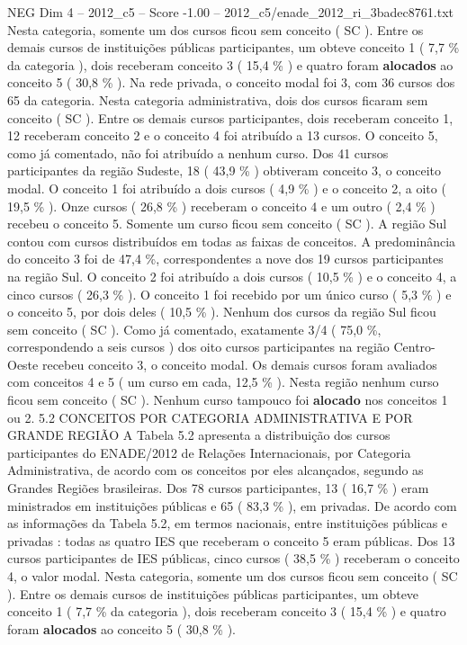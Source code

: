 \begin{textsample}{NEG Dim 4 – 2012\_c5 – Score -1.00 – 2012\_c5/enade\_2012\_ri\_3badec8761.txt}
Nesta categoria, somente um dos cursos ficou sem conceito ( SC ).
Entre os demais cursos de instituições públicas participantes, um obteve conceito 1 ( 7,7 \% da categoria ), dois receberam conceito 3 ( 15,4 \% ) e quatro foram \textbf{alocados} ao conceito 5 ( 30,8 \% ).
Na rede privada, o conceito modal foi 3, com 36 cursos dos 65 da categoria.
Nesta categoria administrativa, dois dos cursos ficaram sem conceito ( SC ).
Entre os demais cursos participantes, dois receberam conceito 1, 12 receberam conceito 2 e o conceito 4 foi atribuído a 13 cursos.
O conceito 5, como já comentado, não foi atribuído a nenhum curso.
Dos 41 cursos participantes da região Sudeste, 18 ( 43,9 \% ) obtiveram conceito 3, o conceito modal.
O conceito 1 foi atribuído a dois cursos ( 4,9 \% ) e o conceito 2, a oito ( 19,5 \% ).
Onze cursos ( 26,8 \% ) receberam o conceito 4 e um outro ( 2,4 \% ) recebeu o conceito 5.
Somente um curso ficou sem conceito ( SC ).
A região Sul contou com cursos distribuídos em todas as faixas de conceitos.
A predominância do conceito 3 foi de 47,4 \%, correspondentes a nove dos 19 cursos participantes na região Sul.
O conceito 2 foi atribuído a dois cursos ( 10,5 \% ) e o conceito 4, a cinco cursos ( 26,3 \% ).
O conceito 1 foi recebido por um único curso ( 5,3 \% ) e o conceito 5, por dois deles ( 10,5 \% ).
Nenhum dos cursos da região Sul ficou sem conceito ( SC ).
Como já comentado, exatamente 3/4 ( 75,0 \%, correspondendo a seis cursos ) dos oito cursos participantes na região Centro-Oeste recebeu conceito 3, o conceito modal.
Os demais cursos foram avaliados com conceitos 4 e 5 ( um curso em cada, 12,5 \% ).
Nesta região nenhum curso ficou sem conceito ( SC ).
Nenhum curso tampouco foi \textbf{alocado} nos conceitos 1 ou 2. 5.2 CONCEITOS POR CATEGORIA ADMINISTRATIVA E POR GRANDE REGIÃO A Tabela 5.2 apresenta a distribuição dos cursos participantes do ENADE/2012 de Relações Internacionais, por Categoria Administrativa, de acordo com os conceitos por eles alcançados, segundo as Grandes Regiões brasileiras.
Dos 78 cursos participantes, 13 ( 16,7 \% ) eram ministrados em instituições públicas e 65 ( 83,3 \% ), em privadas.
De acordo com as informações da Tabela 5.2, em termos nacionais, entre instituições públicas e privadas : todas as quatro IES que receberam o conceito 5 eram públicas.
Dos 13 cursos participantes de IES públicas, cinco cursos ( 38,5 \% ) receberam o conceito 4, o valor modal.
Nesta categoria, somente um dos cursos ficou sem conceito ( SC ).
Entre os demais cursos de instituições públicas participantes, um obteve conceito 1 ( 7,7 \% da categoria ), dois receberam conceito 3 ( 15,4 \% ) e quatro foram \textbf{alocados} ao conceito 5 ( 30,8 \% ).

\end{textsample}
